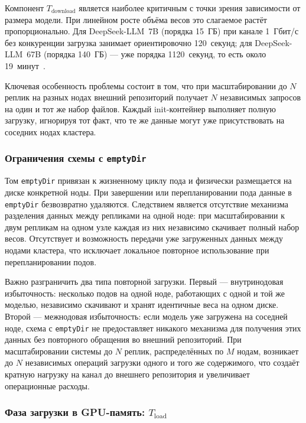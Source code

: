 Компонент $T_{\mathrm{download}}$ является наиболее критичным с точки зрения зависимости от размера модели. При линейном росте объёма весов это слагаемое растёт пропорционально. Для DeepSeek-LLM~7B (порядка 15~ГБ) при канале 1~Гбит/с без конкуренции загрузка занимает ориентировочно 120~секунд; для DeepSeek-LLM~67B (порядка 140~ГБ) --- уже порядка 1120~секунд, то есть около 19~минут~\cite{bentoml2024cold}.

Ключевая особенность проблемы состоит в том, что при масштабировании до $N$ реплик на разных нодах внешний репозиторий получает $N$ независимых запросов на один и тот же набор файлов. Каждый init-контейнер выполняет полную загрузку, игнорируя тот факт, что те же данные могут уже присутствовать на соседних нодах кластера.

\subsubsection{Ограничения схемы с \texttt{emptyDir}}

Том \texttt{emptyDir} привязан к жизненному циклу пода и физически размещается на диске конкретной ноды. При завершении или перепланировании пода данные в \texttt{emptyDir} безвозвратно удаляются. Следствием является отсутствие механизма разделения данных между репликами на одной ноде: при масштабировании к двум репликам на одном узле каждая из них независимо скачивает полный набор весов. Отсутствует и возможность передачи уже загруженных данных между нодами кластера, что исключает локальное повторное использование при перепланировании подов.

Важно разграничить два типа повторной загрузки. Первый --- внутринодовая избыточность: несколько подов на одной ноде, работающих с одной и той же моделью, независимо скачивают и хранят идентичные веса на одном диске. Второй --- межнодовая избыточность: если модель уже загружена на соседней ноде, схема с \texttt{emptyDir} не предоставляет никакого механизма для получения этих данных без повторного обращения во внешний репозиторий. При масштабировании системы до $N$ реплик, распределённых по $M$ нодам, возникает до $N$ независимых операций загрузки одного и того же содержимого, что создаёт кратную нагрузку на канал до внешнего репозитория и увеличивает операционные расходы.

\subsubsection{Фаза загрузки в GPU-память: $T_{\mathrm{load}}$}


